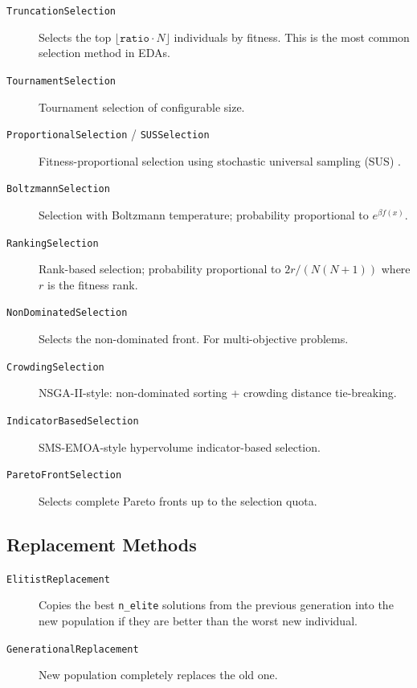 \documentclass[a4paper,11pt]{article}
\begin{document}
\begin{description}
  \item[\texttt{TruncationSelection}]
    Selects the top $\lfloor \texttt{ratio} \cdot N \rfloor$ individuals by
    fitness.  This is the most common selection method in EDAs.

  \item[\texttt{TournamentSelection}]
    Tournament selection of configurable size.

  \item[\texttt{ProportionalSelection} / \texttt{SUSSelection}]
    Fitness-proportional selection using stochastic universal sampling (SUS)
    \citep{Baker:1987}.

  \item[\texttt{BoltzmannSelection}]
    Selection with Boltzmann temperature; probability proportional to
    $e^{\beta f(x)}$.

  \item[\texttt{RankingSelection}]
    Rank-based selection; probability proportional to $2r/(N(N+1))$ where
    $r$ is the fitness rank.

  \item[\texttt{NonDominatedSelection}]
    Selects the non-dominated front.  For multi-objective problems.

  \item[\texttt{CrowdingSelection}]
    NSGA-II-style: non-dominated sorting + crowding distance tie-breaking.

  \item[\texttt{IndicatorBasedSelection}]
    SMS-EMOA-style hypervolume indicator-based selection.

  \item[\texttt{ParetoFrontSelection}]
    Selects complete Pareto fronts up to the selection quota.
\end{description}

\subsection{Replacement Methods}

\begin{description}
  \item[\texttt{ElitistReplacement}]
    Copies the best \texttt{n\_elite} solutions from the previous generation
    into the new population if they are better than the worst new individual.

  \item[\texttt{GenerationalReplacement}]
    New population completely replaces the old one.
\end{description}
\end{document}
